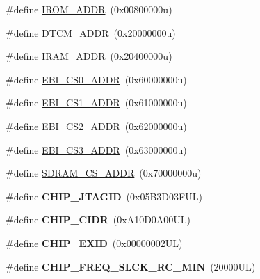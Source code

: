 \begin{DoxyCompactItemize}
\item 
\#define \mbox{\hyperlink{group__SAME70Q19__definitions_ga694212ffb8c2786bacee3d0ad6020bda}{I\+R\+O\+M\+\_\+\+A\+D\+DR}}~(0x00800000u)
\item 
\#define \mbox{\hyperlink{group__SAME70Q19__definitions_ga26626a425f7ebb3a0c2dbc276f0d9f78}{D\+T\+C\+M\+\_\+\+A\+D\+DR}}~(0x20000000u)
\item 
\#define \mbox{\hyperlink{group__SAME70Q19__definitions_gaae45ac2ef16942159481c767ac4805cf}{I\+R\+A\+M\+\_\+\+A\+D\+DR}}~(0x20400000u)
\item 
\#define \mbox{\hyperlink{group__SAME70Q19__definitions_ga9bcbb97ddae3b2cc5e2c9613d33f66b4}{E\+B\+I\+\_\+\+C\+S0\+\_\+\+A\+D\+DR}}~(0x60000000u)
\item 
\#define \mbox{\hyperlink{group__SAME70Q19__definitions_gaaddd9fdbbc77c9aced5308819f502a26}{E\+B\+I\+\_\+\+C\+S1\+\_\+\+A\+D\+DR}}~(0x61000000u)
\item 
\#define \mbox{\hyperlink{group__SAME70Q19__definitions_ga058a35f9991487dc2dd12ada792d0730}{E\+B\+I\+\_\+\+C\+S2\+\_\+\+A\+D\+DR}}~(0x62000000u)
\item 
\#define \mbox{\hyperlink{group__SAME70Q19__definitions_gad66ebdd0fc33ec3cf85dbaa14bbf05d9}{E\+B\+I\+\_\+\+C\+S3\+\_\+\+A\+D\+DR}}~(0x63000000u)
\item 
\#define \mbox{\hyperlink{group__SAME70Q19__definitions_ga61b7db25daf759c2a2beb6e5a0b57a84}{S\+D\+R\+A\+M\+\_\+\+C\+S\+\_\+\+A\+D\+DR}}~(0x70000000u)
\item 
\mbox{\label{group__SAME70Q19__definitions_gaa614519778eec0df55d3eeab3223e3f6}} 
\#define {\bfseries C\+H\+I\+P\+\_\+\+J\+T\+A\+G\+ID}~(0x05\+B3\+D03\+F\+U\+L)
\item 
\mbox{\label{group__SAME70Q19__definitions_ga1e1ae44dd9269a8a98c1d7e7a60e9fbd}} 
\#define {\bfseries C\+H\+I\+P\+\_\+\+C\+I\+DR}~(0x\+A10\+D0\+A00\+U\+L)
\item 
\mbox{\label{group__SAME70Q19__definitions_ga35123717aa86b76bb6b73cf3adc4c2e6}} 
\#define {\bfseries C\+H\+I\+P\+\_\+\+E\+X\+ID}~(0x00000002\+U\+L)
\item 
\mbox{\label{group__SAME70Q19__definitions_ga0e868bf27426399dfdcb3a9dfc3733c4}} 
\#define {\bfseries C\+H\+I\+P\+\_\+\+F\+R\+E\+Q\+\_\+\+S\+L\+C\+K\+\_\+\+R\+C\+\_\+\+M\+IN}~(20000\+U\+L)

\end{DoxyCompactItemize}
